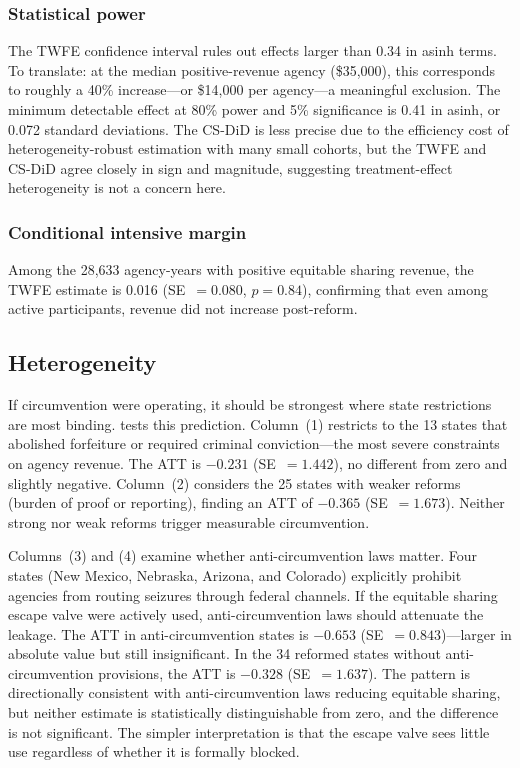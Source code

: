 \documentclass[12pt]{article}
\begin{document}


\subsubsection*{Statistical power} The TWFE confidence interval rules out effects larger than 0.34 in asinh terms. To translate: at the median positive-revenue agency (\$35,000), this corresponds to roughly a 40\% increase---or \$14,000 per agency---a meaningful exclusion. The minimum detectable effect at 80\% power and 5\% significance is 0.41 in asinh, or 0.072 standard deviations. The CS-DiD is less precise due to the efficiency cost of heterogeneity-robust estimation with many small cohorts, but the TWFE and CS-DiD agree closely in sign and magnitude, suggesting treatment-effect heterogeneity is not a concern here.

\subsubsection*{Conditional intensive margin} Among the 28,633 agency-years with positive equitable sharing revenue, the TWFE estimate is 0.016 (SE~$= 0.080$, $p = 0.84$), confirming that even among active participants, revenue did not increase post-reform.

\subsection{Heterogeneity}



If circumvention were operating, it should be strongest where state restrictions are most binding.  tests this prediction. Column~(1) restricts to the 13 states that abolished forfeiture or required criminal conviction---the most severe constraints on agency revenue. The ATT is $-0.231$ (SE~$= 1.442$), no different from zero and slightly negative. Column~(2) considers the 25 states with weaker reforms (burden of proof or reporting), finding an ATT of $-0.365$ (SE~$= 1.673$). Neither strong nor weak reforms trigger measurable circumvention.

Columns~(3) and (4) examine whether anti-circumvention laws matter. Four states (New Mexico, Nebraska, Arizona, and Colorado) explicitly prohibit agencies from routing seizures through federal channels. If the equitable sharing escape valve were actively used, anti-circumvention laws should attenuate the leakage. The ATT in anti-circumvention states is $-0.653$ (SE~$= 0.843$)---larger in absolute value but still insignificant. In the 34 reformed states without anti-circumvention provisions, the ATT is $-0.328$ (SE~$= 1.637$). The pattern is directionally consistent with anti-circumvention laws reducing equitable sharing, but neither estimate is statistically distinguishable from zero, and the difference is not significant. The simpler interpretation is that the escape valve sees little use regardless of whether it is formally blocked.
\end{document}
